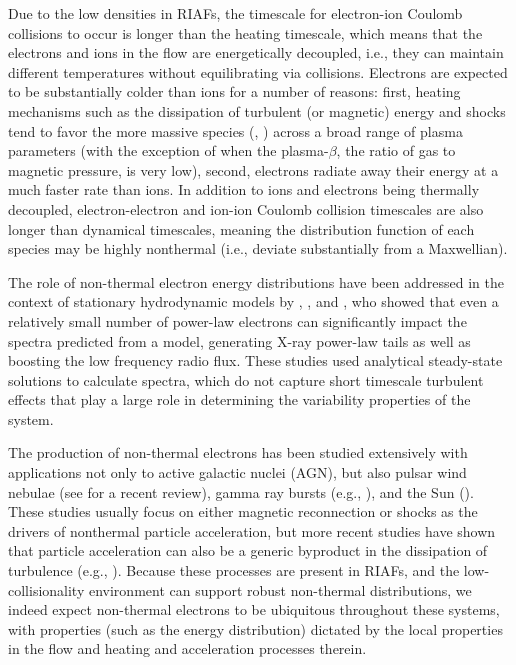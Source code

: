 Due to the low densities in RIAFs, the timescale for electron-ion Coulomb collisions to occur is longer than the heating timescale, which means that the electrons and ions in the flow are energetically decoupled, i.e., they can maintain different temperatures without equilibrating via collisions.  Electrons are expected to be substantially colder than ions for a number of reasons: first, heating mechanisms such as the dissipation of turbulent (or magnetic) energy and shocks tend to favor the more massive species (\citealt{howes2010}, \citealt{rowan2017}) across a broad range of plasma parameters (with the exception of when the plasma-$\beta$, the ratio of gas to magnetic pressure, is very low), second, electrons radiate away their energy at a much faster rate than ions.  In addition to ions and electrons being thermally decoupled, electron-electron and ion-ion Coulomb collision timescales are also longer than dynamical timescales, meaning the distribution function of each species may be highly nonthermal (i.e., deviate substantially from a Maxwellian).

The role of non-thermal electron energy distributions have been addressed in the context of stationary hydrodynamic models by \citet{mahadevan1998}, \citet{ozel2000}, and \citet{yuan2003}, who showed that even a relatively small number of power-law electrons can significantly impact the spectra predicted from a model, generating X-ray power-law tails as well as boosting the low frequency radio flux.  These studies used analytical steady-state solutions to calculate spectra, which do not capture short timescale turbulent effects that play a large role in determining the variability properties of the system.  

The production of non-thermal electrons has been studied extensively with applications not only to active galactic nuclei (AGN), but also pulsar wind nebulae (see \citealt{sironi2017} for a recent review), gamma ray bursts (e.g., \citealt{werner2017}), and the Sun (\citealt{shibata2011}).  These studies usually focus on either magnetic reconnection or shocks as the drivers of nonthermal particle acceleration, but more recent studies have shown that particle acceleration can also be a generic byproduct in the dissipation of turbulence (e.g., \citealt{zhdankin2019, comisso2018, comisso2019}).  Because these processes are present in RIAFs, and the low-collisionality environment can support robust non-thermal distributions, we indeed expect non-thermal electrons to be ubiquitous throughout these systems, with properties (such as the energy distribution) dictated by the local properties in the flow and heating and acceleration processes therein.

